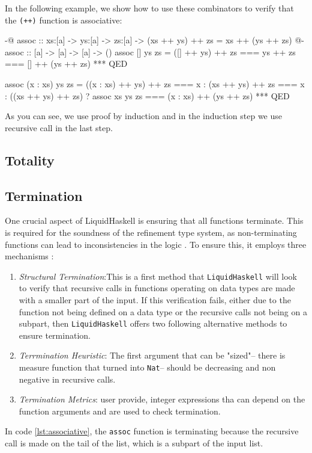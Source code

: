 In the following example, we show how to use these combinators to verify that the \texttt{(++)} function is associative:


\begin{code}[ label=lst:associative]
	{-@ assoc :: xs:[a] -> ys:[a] -> zs:[a]
	-> { (xs ++ ys) ++ zs = xs ++ (ys ++ zs) } @-}
	assoc :: [a] -> [a] -> [a] -> ()
	assoc [] ys zs = ([] ++ ys) ++ zs
	=== ys ++ zs
	=== [] ++ (ys ++ zs)
	*** QED

	assoc (x : xs) ys zs = ((x : xs) ++ ys) ++ zs
	===  x : (xs ++ ys) ++ zs
	=== x : ((xs ++ ys) ++ zs) ? assoc xs ys zs
	=== (x : xs) ++ (ys ++ zs)
	*** QED
\end{code}
\vspace{1em}

As you can see, we use proof by induction and in the induction step we use recursive call in the last step.

\subsection{Totality}
\subsection{Termination}
One crucial aspect of LiquidHaskell is ensuring that all functions terminate.
This is required for the soundness of the refinement type system, as non-terminating functions can lead to inconsistencies in the logic \cite{niki_lecture_2024}.
To ensure this, it employs three mechanisms :
\begin{enumerate}
	\item \textit{Structural Termination}:This is a first method that \texttt{LiquidHaskell} will look to verify that recursive calls in functions operating on data types are made with a smaller part of the input.
	      If this verification fails, either due to the function not being defined on a data type or the recursive calls not being on a subpart, then \texttt{LiquidHaskell} offers two following alternative methods to ensure termination.
	\item \textit{Terrmination Heuristic}: The first argument that can be "sized"-- there is measure function that turned into \texttt{Nat}--
	      should be decreasing and non negative in recursive calls.

	\item \textit{Termination Metrics}: user provide, integer expressions tha can depend on the function arguments and are used to check termination.
\end{enumerate}
In code \ref{lst:associative}, the \texttt{assoc} function is terminating because the recursive call is made on the tail of the list, which is a subpart of the input list.

